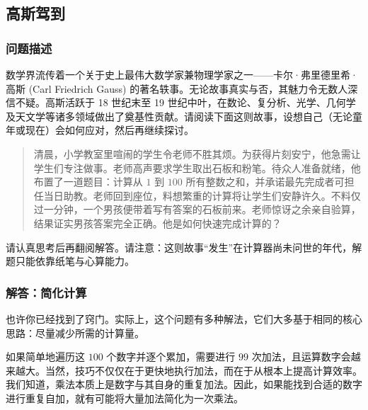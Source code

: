 \subsection{高斯驾到}\label{sec:section1.4.2}

\subsubsection*{问题描述}

数学界流传着一个关于史上最伟大数学家兼物理学家之一——卡尔·弗里德里希·高斯 (Carl Friedrich Gauss) 的著名轶事。无论故事真实与否，其魅力令无数人深信不疑。高斯活跃于 18 世纪末至 19 世纪中叶，在数论、复分析、光学、几何学及天文学等诸多领域做出了奠基性贡献。请阅读下面这则故事，设想自己（无论童年或现在）会如何应对，然后再继续探讨。

\begin{quote}
    清晨，小学教室里喧闹的学生令老师不胜其烦。为获得片刻安宁，他急需让学生们专注做事。老师高声要求学生取出石板和粉笔。待众人准备就绪，他布置了一道题目：计算从 $1$ 到 $100$ 所有整数之和，并承诺最先完成者可担任当日助教。老师回到座位，料想繁重的计算将让学生们安静许久。不料仅过一分钟，一个男孩便带着写有答案的石板前来。老师惊讶之余亲自验算，结果证实男孩答案完全正确。他是如何快速完成计算的？
\end{quote}

请认真思考后再翻阅解答。请注意：这则故事``发生''在计算器尚未问世的年代，解题只能依靠纸笔与心算能力。

\clearpage

\subsubsection*{解答：简化计算}

也许你已经找到了窍门。实际上，这个问题有多种解法，它们大多基于相同的核心思路：尽量减少所需的计算量。

如果简单地遍历这 $100$ 个数字并逐个累加，需要进行 $99$ 次加法，且运算数字会越来越大。当然，技巧不仅仅在于更快地执行加法，而在于从根本上提高计算效率。我们知道，乘法本质上是数字与其自身的重复加法。因此，如果能找到合适的数字进行重复自加，就有可能将大量加法简化为一次乘法。

